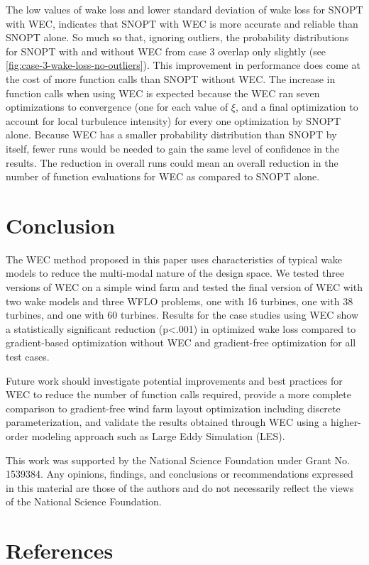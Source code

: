 \documentclass[a4paper]{jpconf}
\begin{document}
The low values of wake loss and lower standard deviation of wake loss for SNOPT with WEC, indicates that SNOPT with WEC is more accurate and reliable than SNOPT alone. So much so that, ignoring outliers, the probability distributions for SNOPT with and without WEC from case 3 overlap only slightly (see \cref{fig:case-3-wake-loss-no-outliers}). This improvement in performance does come at the cost of more function calls than SNOPT without WEC. The increase in function calls when using WEC is expected because the WEC ran seven optimizations to convergence (one for each value of $\xi$, and a final optimization to account for local turbulence intensity) for every one optimization by SNOPT alone. Because WEC has a smaller probability distribution than SNOPT by itself, fewer runs would be needed to gain the same level of confidence in the results. The reduction in overall runs could mean an overall reduction in the number of function evaluations for WEC as compared to SNOPT alone.

\section{Conclusion}
The WEC method proposed in this paper uses characteristics of typical wake models to reduce the multi-modal nature of the design space. We tested three versions of WEC on a simple wind farm and tested the final version of WEC with two wake models and three WFLO problems, one with 16 turbines, one with 38 turbines, and one with 60 turbines. Results for the case studies using WEC show a statistically significant reduction  (p<.001) in optimized wake loss compared to gradient-based optimization without WEC and gradient-free optimization for all test cases.

Future work should investigate potential improvements and best practices for WEC to reduce the number of function calls required, provide a more complete comparison to gradient-free wind farm layout optimization including discrete parameterization, and validate the results obtained through WEC using a higher-order modeling approach such as Large Eddy Simulation (LES).

\ack 
This work was supported by the National Science Foundation under Grant No. 1539384. Any opinions, findings, and conclusions or recommendations expressed in this material are those of the authors and do not necessarily reflect the views of the National Science Foundation.

\section*{References}


\end{document}
